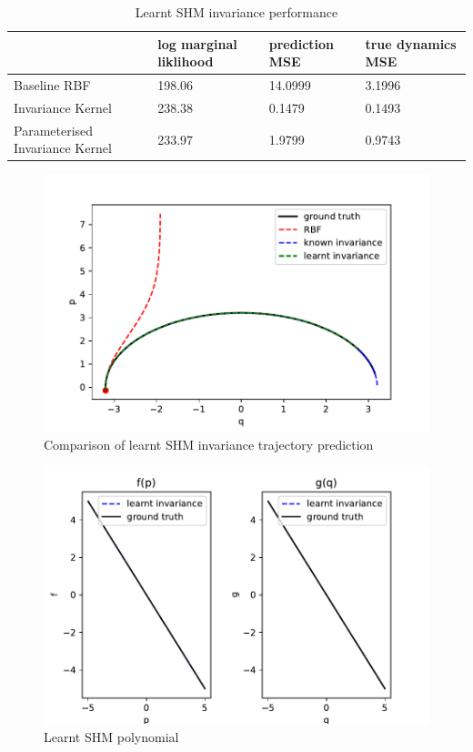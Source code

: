 \documentclass{statsmsc}
\begin{document}
\begin{table}[H]
  \centering
  \begin{tabular}{l l l l} 
                    \hline
                    & log marginal liklihood &  prediction MSE  & true dynamics MSE\\
                    \hline
Baseline RBF & 198.06 & 14.0999 & 3.1996 \\
Invariance Kernel & 238.38 & 0.1479 & 0.1493 \\
Parameterised Invariance Kernel & 233.97 & 1.9799 & 0.9743 \\
                    \hline
  \end{tabular}
  \caption{Learnt SHM invariance performance}
  \label{tab:paramertised_shm_performance}
\end{table}

\begin{figure}[H] 
  \includegraphics[width=0.6\linewidth]{../codes/figures/parameterised_shm_predicted_trajectory.pdf}
  \centering
  \caption{Comparison of learnt SHM invariance trajectory prediction}
  \label{fig:parameterised_shm_trajectory}
\end{figure}

\begin{figure}[H] 
  \includegraphics[width=0.6\linewidth]{../codes/figures/parameterised_shm_learnt_polynomial.pdf}
  \centering
  \caption{Learnt SHM polynomial}
  \label{fig:parameterised_shm_polynomial}
\end{figure}
\end{document}
